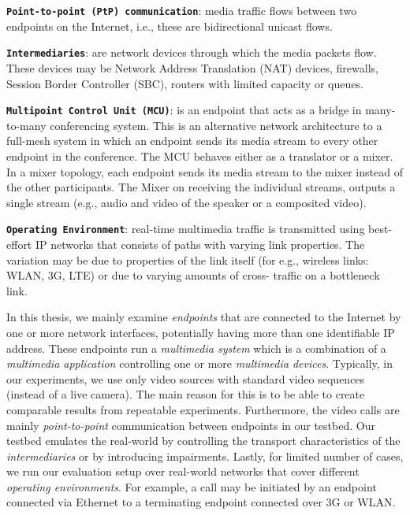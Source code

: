 
\textbf{\texttt{Point-to-point (PtP) communication}}: media traffic flows
between two endpoints on the Internet, i.e., these are bidirectional unicast
flows.

\textbf{\texttt{Intermediaries}}: are network devices through which the media
packets flow. These devices may be Network Address Translation (NAT) devices,
firewalls, Session Border Controller (SBC), routers with limited capacity or
queues.

\textbf{\texttt{Multipoint Control Unit (MCU)}}: is an endpoint that acts as a
bridge in many-to-many conferencing system. This is an alternative network
architecture to a full-mesh system in which an endpoint sends its media stream
to every other endpoint in the conference. The MCU behaves either as a
translator or a mixer. In a mixer topology, each endpoint sends its media
stream to the mixer instead of the other participants. The Mixer on receiving
the individual streams, outputs a single stream (e.g., audio and video of the
speaker or a composited video).

\textbf{\texttt{Operating Environment}}: real-time multimedia traffic is
transmitted using best-effort IP networks that consists of paths with varying
link properties. The variation may be due to properties of the link itself
(for e.g., wireless links: WLAN, 3G, LTE) or due to varying amounts of cross-
traffic on a bottleneck link.


In this thesis, we mainly examine \emph{endpoints} that are connected to the
Internet by one or more network interfaces, potentially having more than one
identifiable IP address. These endpoints run a \emph{multimedia system} which
is a combination of a \emph{multimedia application} controlling one or more
\emph{multimedia devices}. Typically, in our experiments, we use only video
sources with standard video sequences (instead of a live camera). The main
reason for this is to be able to create comparable results from repeatable
experiments. Furthermore, the video calls are mainly \emph{point-to-point}
communication between endpoints in our testbed. Our testbed emulates the
real-world by controlling the transport characteristics of the
\emph{intermediaries} or by introducing impairments. Lastly, for limited
number of cases, we run our evaluation setup over real-world networks that
cover different \emph{operating environments}. For example, a call may be
initiated by an endpoint connected via Ethernet to a terminating endpoint
connected over 3G or WLAN.

